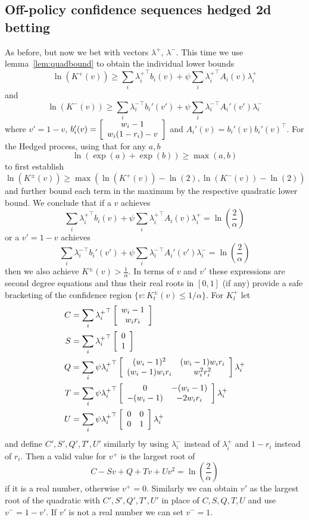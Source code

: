 \subsection{Off-policy confidence sequences hedged 2d betting}
As before, but now we bet with vectors $\lambda^+$, $\lambda^-$.
This time we use lemma~\ref{lem:quadbound}
to obtain the individual lower bounds
\[
\ln(K^{+}(v)) \geq \sum_i {\lambda_i^+}^\top b_i(v) + \psi \sum_i {\lambda_i^+}^\top A_i(v) {\lambda_i^+}
\]
and
\[
\ln(K^{-}(v)) \geq \sum_i {\lambda_i^-}^\top b_i'(v') + \psi \sum_i {\lambda_i^-}^\top A_i'(v') {\lambda_i^-}
\]
where $v'=1-v$, 
$b_i'(v)=
\left[\begin{array}{c} w_i-1 \\ w_i (1-r_i) -v \end{array}\right]
$
and $A_i'(v)=b_i'(v)b_i'(v)^\top$.
For the Hedged process, using that for any $a,b$
\[
\ln\left(\exp(a)+\exp(b)\right)\geq \max(a,b)
\]
to first establish
\[
\ln(K^\pm(v)) \geq \max(\ln(K^+(v))-\ln(2),\ln(K^-(v))-\ln(2))
\]
and further bound each term in the maximum by the respective 
quadratic lower bound. We conclude that
if a $v$ achieves 
\[
\sum_i {\lambda_i^+}^\top b_i(v) + \psi \sum_i {\lambda_i^+}^\top A_i(v) \lambda_i^+ = \ln\left(\frac{2}{\alpha}\right)
\]
or a $v'=1-v$ achieves 
\[
\sum_i {\lambda_i^-}^\top b_i'(v') + \psi \sum_i {\lambda_i^-}^\top A_i'(v') \lambda_i^- = \ln\left(\frac{2}{\alpha}\right)
\]
then we also achieve $K^\pm(v) > \frac{1}{\alpha}$.
In terms of $v$ and $v'$ these expressions are second degree
equations and thus their real roots in $[0,1]$ (if any) provide 
a safe bracketing of the confidence region $\{v:K_t^\pm(v)\leq 1/\alpha\}$. For $K_t^+$ let
\begin{align}
C&=\sum_i {\lambda_i^+}^\top \left[\begin{array}{c} w_i-1 \\ w_i r_i \end{array}\right] \label{eq:upsuffc}\\
S&=\sum_i {\lambda_i^+}^\top \left[\begin{array}{c} 0 \\ 1 \end{array}\right] \\
Q&=\sum_i \psi  {\lambda_i^+}^\top \left[\begin{array}{cc} (w_i-1)^2 & (w_i-1)w_i r_i \\ (w_i-1)w_i r_i & w_i^2r_i^2 \end{array}\right] \lambda_i^+ \\
T&=\sum_i \psi  {\lambda_i^+}^\top \left[\begin{array}{cc} 0 & -(w_i-1) \\ -(w_i-1) & -2w_ir_i \end{array}\right] \lambda_i^+ \\
U&=\sum_i \psi {\lambda_i^+}^\top \left[\begin{array}{cc} 0 & 0 \\ 0 & 1 \end{array}\right] \lambda_i^+ \label{eq:upsuffu}
\end{align}
and define $C',S',Q',T',U'$ similarly by using $\lambda_i^-$ 
instead of $\lambda_i^+$ and $1-r_i$ instead of $r_i$. Then
a valid value for $v^+$ is the largest root of
\[
C - S v + Q + T v + U v^2 = \ln\left(\frac{2}{\alpha}\right)
\]
if it is a real number, otherwise $v^+=0$. Similarly
we can obtain $v'$ as the largest root of the quadratic
with $C',S',Q',T',U'$ in place of $C,S,Q,T,U$ and use
$v^-=1-v'$. If $v'$ is not a real number we can 
set $v^-=1$.



